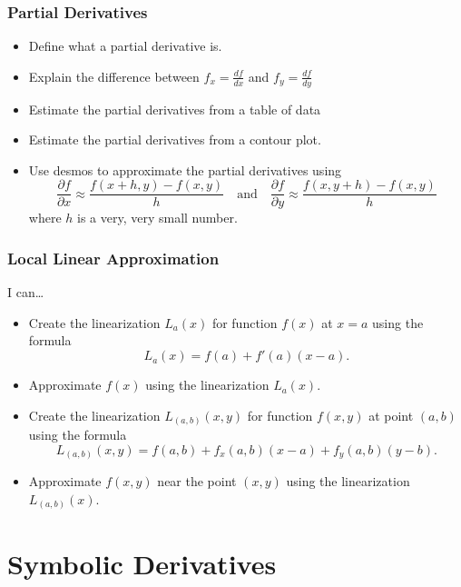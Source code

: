 \documentclass[
]{book}
\providecommand{\tightlist}{%
  \setlength{\itemsep}{0pt}\setlength{\parskip}{0pt}}
\begin{document}
\hypertarget{partial-derivatives-1}{%
\section{Partial Derivatives}\label{partial-derivatives-1}}

\begin{itemize}
\tightlist
\item
  Define what a partial derivative is.
\item
  Explain the difference between \(\displaystyle{f_x = \frac{df}{dx}}\) and \(\displaystyle{f_y = \frac{df}{dy}}\)
\item
  Estimate the partial derivatives from a table of data
\item
  Estimate the partial derivatives from a contour plot.
\item
  Use desmos to approximate the partial derivatives using
  \[
  \frac{\partial f}{\partial x} \approx \frac{f(x+h,y) - f(x,y)}{h} \quad \mbox{and} \quad \frac{\partial f}{\partial y} \approx \frac{f(x,y+h) - f(x,y)}{h}
  \]
  where \(h\) is a very, very small number.
\end{itemize}

\hypertarget{local-linear-approximation-1}{%
\section{Local Linear Approximation}\label{local-linear-approximation-1}}

I can\ldots{}

\begin{itemize}
\tightlist
\item
  Create the linearization \(L_a(x)\) for function \(f(x)\) at \(x=a\) using the formula
  \[
  L_a(x) = f(a) + f'(a) (x-a).
  \]
\item
  Approximate \(f(x)\) using the linearization \(L_a(x)\).
\item
  Create the linearization \(L_{(a,b)}(x,y)\) for function \(f(x,y)\) at point \((a,b)\) using the formula
  \[
  L_{(a,b)}(x,y) = f(a,b) + f_x(a,b) (x-a) + f_y(a,b) (y-b).
  \]
\item
  Approximate \(f(x,y)\) near the point \((x,y)\) using the linearization \(L_{(a,b)}(x)\).
\end{itemize}

\hypertarget{part-symbolic-derivatives}{%
\part{Symbolic Derivatives}\label{part-symbolic-derivatives}}
\end{document}
